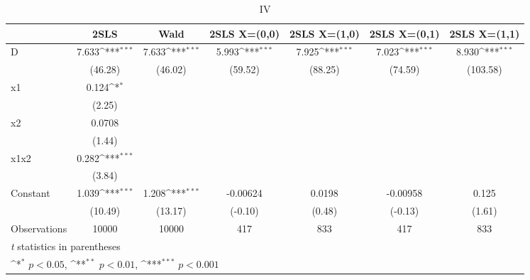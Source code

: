 \begin{table}[htbp]\centering
\def\sym#1{\ifmmode^{#1}\else\(^{#1}\)\fi}
\caption{IV\label{tab:IV-2SLS-IV-Wald-CP}}
\begin{tabular}{l*{6}{c}}
\toprule
                    &\multicolumn{1}{c}{2SLS}&\multicolumn{1}{c}{Wald}&\multicolumn{1}{c}{2SLS X=(0,0)}&\multicolumn{1}{c}{2SLS X=(1,0)}&\multicolumn{1}{c}{2SLS X=(0,1)}&\multicolumn{1}{c}{2SLS X=(1,1)}\\
\midrule
D                   &       7.633\sym{***}&       7.633\sym{***}&       5.993\sym{***}&       7.925\sym{***}&       7.023\sym{***}&       8.930\sym{***}\\
                    &     (46.28)         &     (46.02)         &     (59.52)         &     (88.25)         &     (74.59)         &    (103.58)         \\
\addlinespace
x1                  &       0.124\sym{*}  &                     &                     &                     &                     &                     \\
                    &      (2.25)         &                     &                     &                     &                     &                     \\
\addlinespace
x2                  &      0.0708         &                     &                     &                     &                     &                     \\
                    &      (1.44)         &                     &                     &                     &                     &                     \\
\addlinespace
x1x2                &       0.282\sym{***}&                     &                     &                     &                     &                     \\
                    &      (3.84)         &                     &                     &                     &                     &                     \\
\addlinespace
Constant            &       1.039\sym{***}&       1.208\sym{***}&    -0.00624         &      0.0198         &    -0.00958         &       0.125         \\
                    &     (10.49)         &     (13.17)         &     (-0.10)         &      (0.48)         &     (-0.13)         &      (1.61)         \\
\midrule
Observations        &       10000         &       10000         &         417         &         833         &         417         &         833         \\
\bottomrule
\multicolumn{7}{l}{\footnotesize \textit{t} statistics in parentheses}\\
\multicolumn{7}{l}{\footnotesize \sym{*} \(p<0.05\), \sym{**} \(p<0.01\), \sym{***} \(p<0.001\)}\\
\end{tabular}
\end{table}

